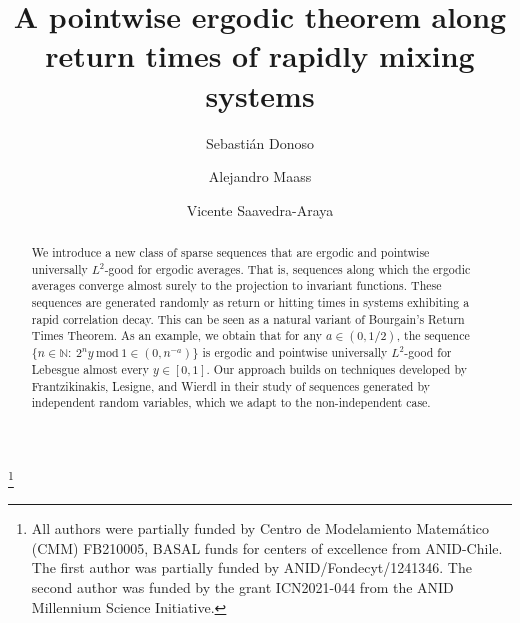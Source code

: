 \documentclass[11pt]{amsart}
\numberwithin{equation}{section}
\theoremstyle{definition}
\newcommand{\Mod}[1]{\ \mathrm{mod}\ #1}
\theoremstyle{plain}
\newcommand{\N}{{\mathbb N}}
\begin{document}
\title{A pointwise ergodic theorem along return times of rapidly mixing systems}






\author{Sebasti\'an Donoso}
\address{Departamento de Ingenier\'{\i}a Matem\'atica and Centro de Modelamiento Matem{\'a}tico, Universidad de Chile \& IRL 2807 - CNRS, Beauchef 851, Santiago, Chile}

\author{Alejandro Maass}
\address{Departamento de Ingeniería Matemática, Centro de Modelamiento Matemático and Millennium Institute Center for Genome Regulation, Santiago, Chile, Universidad de Chile and IRL-CNRS 2807, Beauchef 851, Santiago, Chile.}

\author{Vicente Saavedra-Araya}
\address{Department of Mathematics, University of Warwick, Coventry, United Kingdom}	


\thanks{ 
All authors were partially funded by Centro de Modelamiento Matemático (CMM) FB210005, BASAL funds for centers of excellence from ANID-Chile. The first author was partially funded by ANID/Fondecyt/1241346. The second author was funded by the grant ICN2021-044 from the ANID Millennium Science Initiative.
}




    
\begin{abstract} We introduce a new class of sparse sequences that are ergodic and pointwise universally $L^2$-good for ergodic averages. That is, sequences along which the ergodic averages converge almost surely to the projection to invariant functions. These sequences are generated randomly as return or hitting times in systems exhibiting a rapid correlation decay. This can be seen as a natural variant of Bourgain's Return Times Theorem.  As an example, we obtain that for any $a\in (0,1/2)$, the sequence $\{n\in\N:\ 2^ny\Mod{1}\in (0,n^{-a})\}$ is ergodic and pointwise universally $L^2$-good for Lebesgue almost every $y\in [0,1]$.  Our approach builds on techniques developed by Frantzikinakis, Lesigne, and Wierdl in their study of sequences generated by independent random variables, which we adapt to the non-independent case.
\end{abstract}
\end{document}
